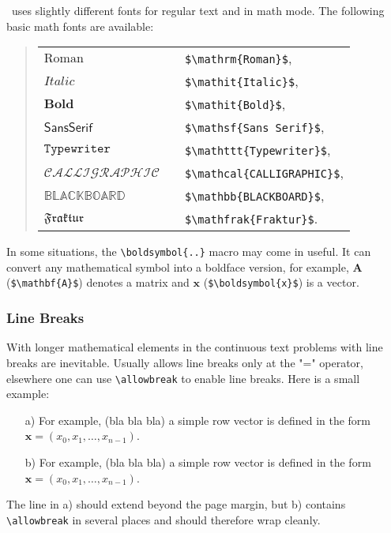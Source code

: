 \latex\ uses slightly different fonts for regular text and in math mode.
The following basic math fonts are available:
%
\begin{quote}
    \begin{tabular}{lcl}
        $\mathrm{Roman}$      & & \verb!$\mathrm{Roman}$!,      \\
				$\mathit{Italic}$     & & \verb!$\mathit{Italic}$!,      \\
				$\mathbf{Bold}$     	& & \verb!$\mathit{Bold}$!,      \\
        $\mathsf{Sans Serif}$ & & \verb!$\mathsf{Sans Serif}$!, \\
        $\mathtt{Typewriter}$ & & \verb!$\mathttt{Typewriter}$!, \\
				$\mathcal{CALLIGRAPHIC}$ & & \verb!$\mathcal{CALLIGRAPHIC}$!,\\
				$\mathbb{BLACKBOARD}$ & & \verb!$\mathbb{BLACKBOARD}$!,\\
				$\mathfrak{Fraktur}$ & & \verb!$\mathfrak{Fraktur}$!.
    \end{tabular}
\end{quote}
%
In some situations, the \verb!\boldsymbol{..}! macro may come in useful. It can 
convert any mathematical symbol into a boldface version, for example,
$\mathbf{A}$ (\verb!$\mathbf{A}$!) denotes a matrix and $\boldsymbol{x}$ 
(\verb!$\boldsymbol{x}$!) is a vector.


\subsubsection{Line Breaks}

With longer mathematical elements in the continuous text problems with line breaks 
are inevitable. Usually \latex allows line breaks only at the "=" operator, 
elsewhere one can use \verb|\allowbreak| to enable line breaks. Here is a small
example:
%
\begin{itemize}
	\item[a)] For example, (bla bla bla) a simple row vector is defined in the form
	$\boldsymbol{x} = (x_0, x_1, \ldots, x_{n-1})$.
	\item[b)] For example, (bla bla bla) a simple row vector is defined in the form
	$\boldsymbol{x} = (x_0,\allowbreak x_1,\allowbreak\ldots,\allowbreak
	x_{n-1})$.
\end{itemize}
%
The line in a) should extend beyond the page margin, but b) contains 
\verb|\allowbreak| in several places and should therefore wrap cleanly.


